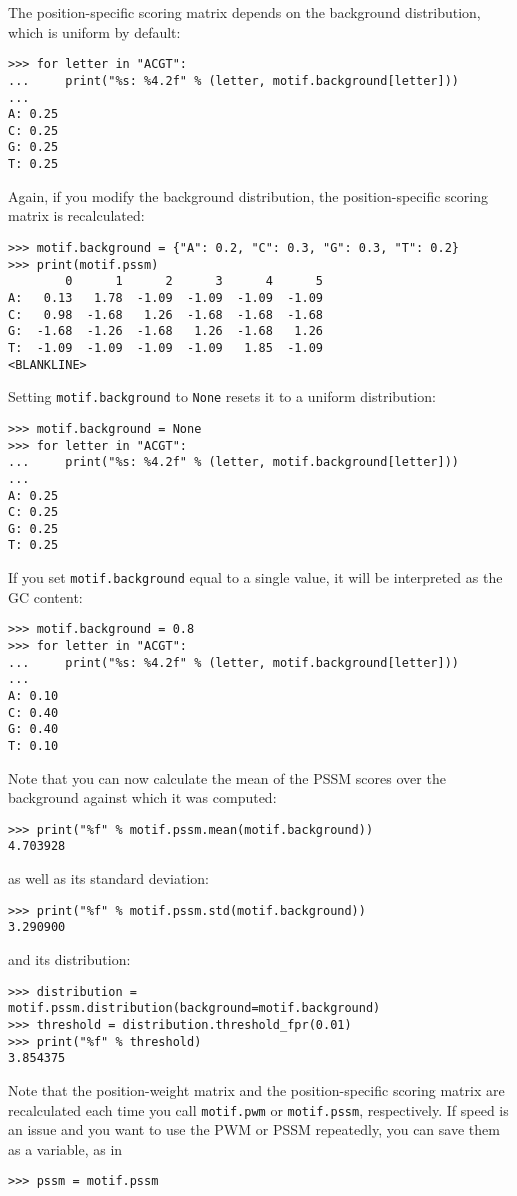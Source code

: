 The position-specific scoring matrix depends on the background distribution, which is uniform by default:
\begin{verbatim}
>>> for letter in "ACGT":
...     print("%s: %4.2f" % (letter, motif.background[letter]))
...
A: 0.25
C: 0.25
G: 0.25
T: 0.25
\end{verbatim}
Again, if you modify the background distribution, the position-specific scoring matrix is recalculated:
\begin{verbatim}
>>> motif.background = {"A": 0.2, "C": 0.3, "G": 0.3, "T": 0.2}
>>> print(motif.pssm)
        0      1      2      3      4      5
A:   0.13   1.78  -1.09  -1.09  -1.09  -1.09
C:   0.98  -1.68   1.26  -1.68  -1.68  -1.68
G:  -1.68  -1.26  -1.68   1.26  -1.68   1.26
T:  -1.09  -1.09  -1.09  -1.09   1.85  -1.09
<BLANKLINE>
\end{verbatim}
Setting \verb+motif.background+ to \verb+None+ resets it to a uniform distribution:
\begin{verbatim}
>>> motif.background = None
>>> for letter in "ACGT":
...     print("%s: %4.2f" % (letter, motif.background[letter]))
...
A: 0.25
C: 0.25
G: 0.25
T: 0.25
\end{verbatim}
If you set \verb+motif.background+ equal to a single value, it will be interpreted as the GC content:
\begin{verbatim}
>>> motif.background = 0.8
>>> for letter in "ACGT":
...     print("%s: %4.2f" % (letter, motif.background[letter]))
...
A: 0.10
C: 0.40
G: 0.40
T: 0.10
\end{verbatim}
Note that you can now calculate the mean of the PSSM scores over the background against which it was computed:
\begin{verbatim}
>>> print("%f" % motif.pssm.mean(motif.background))
4.703928
\end{verbatim}
as well as its standard deviation:
\begin{verbatim}
>>> print("%f" % motif.pssm.std(motif.background))
3.290900
\end{verbatim}
and its distribution:
\begin{verbatim}
>>> distribution = motif.pssm.distribution(background=motif.background)
>>> threshold = distribution.threshold_fpr(0.01)
>>> print("%f" % threshold)
3.854375
\end{verbatim}

Note that the position-weight matrix and the position-specific scoring matrix are recalculated each time you call \verb+motif.pwm+ or \verb+motif.pssm+, respectively. If speed is an issue and you want to use the PWM or PSSM repeatedly, you can save them as a variable, as in
\begin{verbatim}
>>> pssm = motif.pssm
\end{verbatim}


